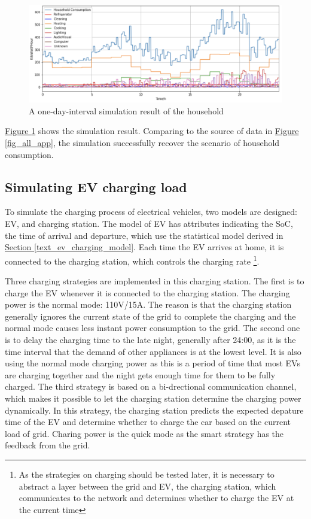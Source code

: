 \documentclass[12pt,a4paper]{report}
\begin{document}
                \begin{figure}[ht]
                    \centerline{\includegraphics[scale=1]{simu_household}}
                    \caption{A one-day-interval simulation result of the household}
                    \label{fig_simu_household}
                \end{figure}

                \hyperref[fig_simu_household]{Figure \ref*{fig_simu_household}} shows the simulation result. Comparing to the source of data in \hyperref[fig_all_app]{Figure \ref*{fig_all_app}}, the simulation successfully recover the scenario of household consumption.
                \subsection{Simulating EV charging load}
                To simulate the charging process of electrical vehicles, two models are designed: EV, and charging station. The model of EV has attributes indicating the SoC, the time of arrival and departure, which use the statistical model derived in \hyperref[text_ev_charging_model]{Section \ref*{text_ev_charging_model}}. Each time the EV arrives at home, it is connected to the charging station, which controls the charging rate \footnote{As the strategies on charging should be tested later, it is necessary to abstract a layer between the grid and EV, the charging station, which communicates to the network and determines whether to charge the EV at the current time}.

                Three charging strategies are implemented in this charging station. The first is to charge the EV whenever it is connected to the charging station. The charging power is the normal mode: 110V/15A. The reason is that the charging station generally ignores the current state of the grid to complete the charging and the normal mode causes less instant power consumption to the grid. The second one is to delay the charging time to the late night, generally after 24:00, as it is the time interval that the demand of other appliances is at the lowest level. It is also using the normal mode charging power as this is a period of time that most EVs are charging together and the night gets enough time for them to be fully charged. The third strategy is based on a bi-drectional communication channel, which makes it possible to let the charging station determine the charging power dynamically. In this strategy, the charging station predicts the expected depature time of the EV and determine whether to charge the car based on the current load of grid. Charing power is the quick mode as the smart strategy has the feedback from the grid.
\end{document}

